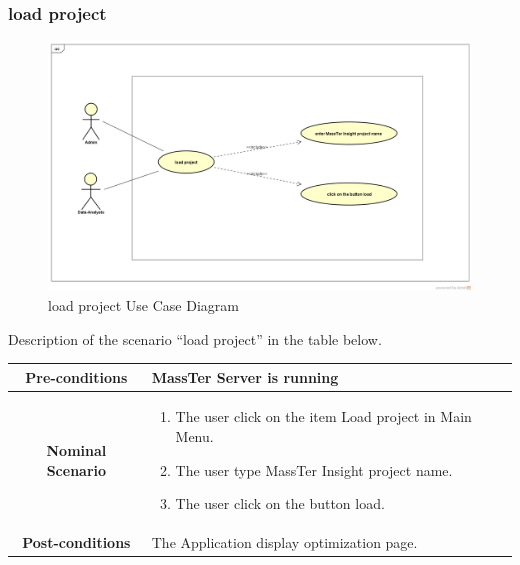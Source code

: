 	 \subsubsection{load project}
	 	\begin{figure}[h]
	\centering
	\includegraphics[width=1.0\textwidth]{loadProject.png}
	\caption{load project Use Case Diagram}
	
	\end{figure}

 Description of the scenario ``load project'' in the table below.
 
  \begin{table}
 	\centering
 	\begin{tabular}{|c|p{10cm}|}
 		\hline 	
 		\textbf{Pre-conditions } & MassTer Server is running \\ 
 		\hline                     
 		\textbf{Nominal Scenario } & \begin{enumerate}
 			\item The user click on the item Load project in Main Menu.
 			\item The user type MassTer Insight project name.
 			\item The user click on the button load. 
 		\end{enumerate} \\ 
 		\hline 
 		\textbf{Post-conditions} & The Application display optimization page. \\
 		\hline 
 	\end{tabular}
 \end{table}
 
\clearpage
\newpage

